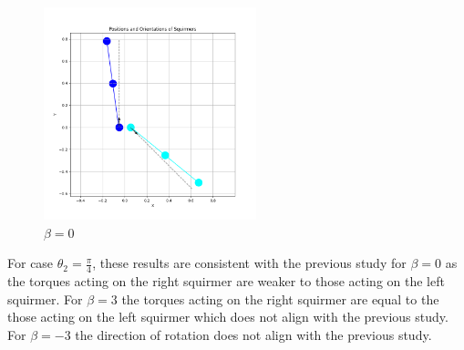 \documentclass{article}
\begin{document}
\begin{figure}[H]
\begin{minipage}{0.49\textwidth}
        \caption{\footnotesize $\beta = 3$}
    \end{minipage}
    \includegraphics[width=0.55\textwidth]{graphs/simulations/sim_sq_sq/beta0/mpi_4_.png}
    \caption{\footnotesize $\beta = 0$}
\end{figure}
For case $\theta_2 = \frac{\pi}{4}$, these results are consistent with the previous study\cite{Stark} for $\beta = 0$ as the torques acting on the right 
squirmer are weaker to those acting on the left squirmer. For $\beta = 3$ the torques acting on the right squirmer are
equal to the those acting on the left squirmer which does not align with the previous study.
For $\beta = -3$ the direction of rotation does not align with the previous study.
\\
\\
\end{document}
